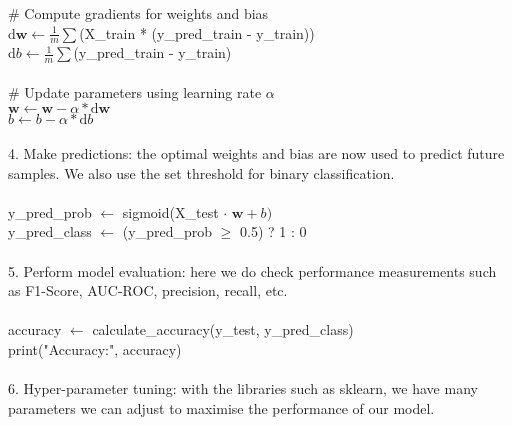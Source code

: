 \documentclass[10pt]{article}
\begin{document}
{\hspace*{2em} \# Compute gradients for weights and bias\\
\hspace*{2em} \(\text{d}\mathbf{w} \leftarrow \frac{1}{m} \sum\)(X\_train * (y\_pred\_train - y\_train))\\
\hspace*{2em} \(\text{d}b \leftarrow \frac{1}{m} \sum\)(y\_pred\_train - y\_train)
\\\\
\hspace*{2em} \# Update parameters using learning rate \(\alpha\) \\
\hspace*{2em} \(\mathbf{w} \leftarrow \mathbf{w} - \alpha * \text{d}\mathbf{w}\)\\
\hspace*{2em} \(b \leftarrow b - \alpha * \text{d}b\)
\\\\
4. Make predictions: the optimal weights and bias are now used to predict future samples. We also use the set threshold for binary classification.
\\\\
y\_pred\_prob \(\leftarrow\) sigmoid(X\_test \( \cdot\) \(\mathbf{w} + b)\)\\
y\_pred\_class \(\leftarrow\) (y\_pred\_prob \(\geq \) 0.5) ? 1 : 0
\\\\
5. Perform model evaluation: here we do check performance measurements such as F1-Score, AUC-ROC, precision, recall, etc.
\\\\
accuracy \(\leftarrow\) calculate\_accuracy(y\_test, y\_pred\_class)\\
print("Accuracy:", accuracy)
\\\\
6. Hyper-parameter tuning: with the libraries such as sklearn, we have many parameters we can adjust to maximise the performance of our model.
}
\label{pseudo-seb}

\pagebreak
\end{document}
